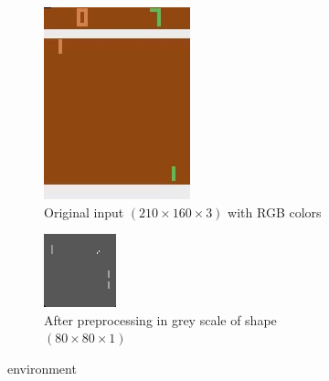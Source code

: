 \documentclass{article}
\begin{document}
\begin{figure}[H]
\centering
\begin{subfigure}[b]{.5\textwidth}
  \centering
  \includegraphics[width=.25\linewidth]{pong}
  \caption{Original input $ (210 \times 160 \times 3) $ with RGB colors}
  \label{fig:pong}
\end{subfigure}
\begin{subfigure}[b]{.5\textwidth}
  \centering
  \includegraphics[width=.15\linewidth]{pong_grey}
  \caption{After preprocessing in grey scale of shape $ (80 \times 80 \times 1 ) $}
  \label{fig:pong_grey}
\end{subfigure}
\caption{ environment}
\label{fig:pong_env}
\end{figure}
\end{document}

